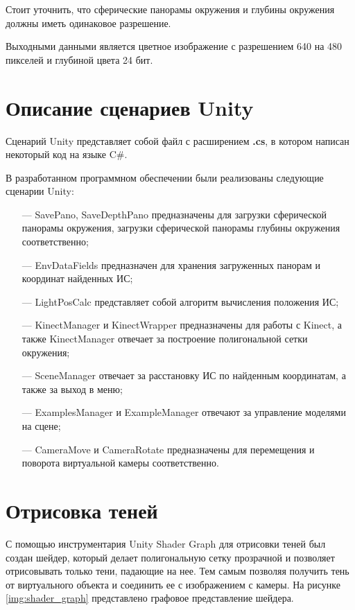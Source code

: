 Стоит уточнить, что сферические панорамы окружения и глубины окружения должны иметь одинаковое разрешение.

Выходными данными является цветное изображение с разрешением 640 на 480 пикселей и глубиной цвета 24 бит.

\section{Описание сценариев Unity}

Сценарий Unity представляет собой файл с расширением \textbf{.cs}, в котором написан некоторый код на языке C\#.

В разработанном программном обеспечении были реализованы следующие сценарии Unity:

\begin{itemize}
	\item[---] SavePano, SaveDepthPano предназначены для загрузки сферической панорамы окружения, загрузки сферической панорамы глубины окружения соответственно;
	\item[---] EnvDataFields предназначен для хранения загруженных панорам и координат найденных ИС;
	\item[---] LightPosCalc представляет собой алгоритм вычисления положения ИС;
	\item[---] KinectManager и KinectWrapper предназначены для работы с Kinect, а также KinectManager отвечает за построение полигональной сетки окружения;
	\item[---] SceneManager отвечает за расстановку ИС по найденным координатам, а также за выход в меню;
	\item[---] ExamplesManager и ExampleManager отвечают за управление моделями на сцене;
	\item[---] CameraMove и CameraRotate предназначены для перемещения и поворота виртуальной камеры соответственно.
\end{itemize}

\section{Отрисовка теней}

С помощью инструментария Unity Shader Graph \cite{shader_graph} для отрисовки теней был создан шейдер, который делает полигональную сетку прозрачной и позволяет отрисовывать только тени, падающие на нее. Тем самым позволяя получить тень от виртуального объекта и соединить ее с изображением с камеры. На рисунке \ref{img:shader_graph} представлено графовое представление шейдера.

